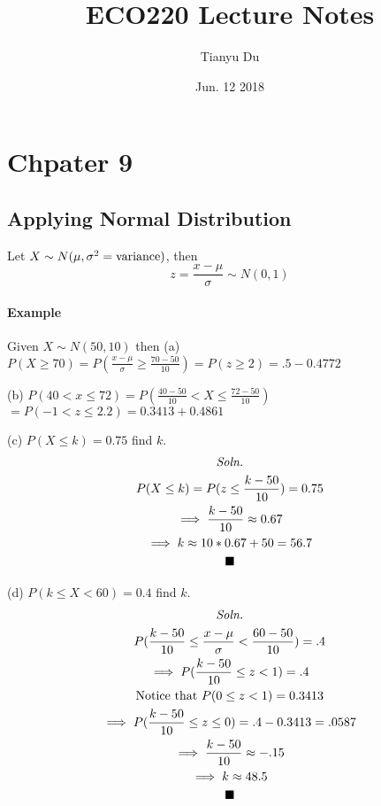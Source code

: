 \documentclass{article}
\title{ECO220 Lecture Notes}
\author{Tianyu Du}
\date{Jun. 12 2018}
\begin{document}
\maketitle

	\section{Chpater 9}
		\subsection{Applying Normal Distribution}

		\begin{theorem}
			Let $X \sim N(\mu, \sigma^2=\text{{variance}})$, then
			\[
				z = \frac{x - \mu}{\sigma} \sim N(0, 1)
			\]
		\end{theorem}

		\paragraph{Example} Given $X \sim N(50, 10)$ then
		\newline
		(a) $P(X \geq 70) = P(\frac{x - \mu}{\sigma} \geq \frac{70 - 50}{10}) = P(z \geq 2)=.5 - 0.4772$
		\newline

		(b) $P(40 < x \leq 72) = P(\frac{40-50}{10} < X \leq \frac{72-50}{10})$
		\newline $= P(-1 < z \leq 2.2) = 0.3413 + 0.4861$
		\newline

		(c) $P(X \leq k) = 0.75$ find $k$.
			\begin{multline*}
				\emph{Soln.} \\
				P(X \leq k) = P(z \leq \frac{k-50}{10}) = 0.75 \\
				\implies \frac{k-50}{10} \approx 0.67 \\
				\implies k \approx 10 * 0.67 + 50 = 56.7\\
				\blacksquare
			\end{multline*}
		\newline

		(d) $P(k \leq X < 60) = 0.4$ find $k$.
			\begin{multline*}
				\emph{Soln.} \\
				P(\frac{k-50}{10} \leq \frac{x-\mu}{\sigma} < \frac{60-50}{10}) = .4 \\
				\implies P(\frac{k-50}{10} \leq z < 1) = .4 \\
				\text{{Notice that }} P(0 \leq z < 1) = 0.3413 \\
				\implies P(\frac{k-50}{10} \leq z \leq 0) = .4 - 0.3413 = .0587 \\
				\implies \frac{k-50}{10} \approx -.15 \\
				\implies k \approx 48.5 \\
				\blacksquare
			\end{multline*}
		\newline
\end{document}
